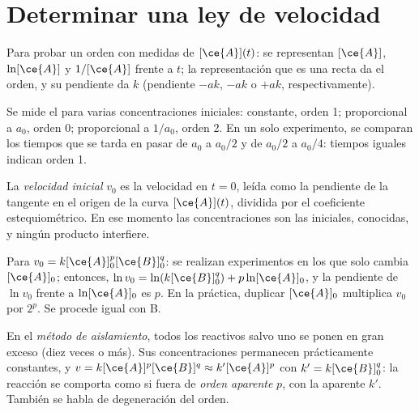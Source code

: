 \section{Determinar una ley de velocidad}

\begin{method}\label{met:b1:rate-laws:integral}
Para probar un orden con medidas de $[\ce{A}](t)$: se representan
$[\ce{A}]$, $\ln[\ce{A}]$ y $1/[\ce{A}]$ frente a $t$; la representación
que es una recta da el orden, y su pendiente da $k$ (pendiente $-ak$,
$-ak$ o $+ak$, respectivamente).
\end{method}

\begin{method}\label{met:b1:rate-laws:half-life}
Se mide el  para varias concentraciones iniciales:
constante, orden 1; proporcional a $a_0$, orden 0; proporcional a
$1/a_0$, orden 2. En un solo experimento, se comparan los tiempos que se
tarda en pasar de $a_0$ a $a_0/2$ y de $a_0/2$ a $a_0/4$: tiempos iguales
indican orden 1.
\end{method}

\begin{definition}\label{def:b1:rate-laws:initial-rate}
La \emph{velocidad inicial} $v_0$ es la velocidad
en $t = 0$, leída como la pendiente de la tangente en el origen de la
curva $[\ce{A}](t)$, dividida por el coeficiente estequiométrico. En ese
momento las concentraciones son las iniciales, conocidas, y ningún
producto interfiere.
\end{definition}

\begin{method}\label{met:b1:rate-laws:initial-rates}
Para $v_0 = k[\ce{A}]_0^p[\ce{B}]_0^q$: se realizan experimentos en los
que solo cambia $[\ce{A}]_0$; entonces, $\ln v_0 = \ln(k[\ce{B}]_0^q) + p\ln[\ce{A}]_0$,
y la pendiente de $\ln v_0$ frente a $\ln[\ce{A}]_0$ es $p$. En la
práctica, duplicar $[\ce{A}]_0$ multiplica $v_0$ por $2^p$. Se procede
igual con B.
\end{method}

\begin{definition}\label{def:b1:rate-laws:apparent-order}
En el \emph{método de aislamiento}, todos los
reactivos salvo uno se ponen en gran exceso (diez veces o más). Sus
concentraciones permanecen prácticamente constantes, y $v = k[\ce{A}]^p[\ce{B}]^q \approx k'[\ce{A}]^p$
con $k' = k[\ce{B}]_0^q$: la reacción se comporta como si fuera de
\emph{orden aparente} $p$, con la  aparente $k'$. También se habla de degeneración del orden.
\end{definition}


